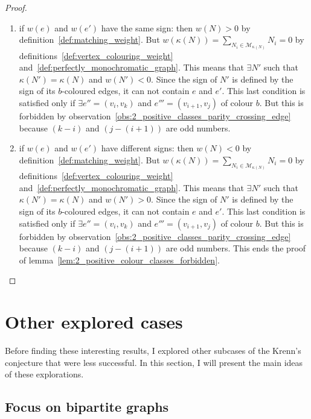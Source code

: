 \begin{proof}
    \begin{enumerate}
        \item if $w(e)$ and $w(e')$ have the same sign: then $w(N) > 0$ by definition~\ref{def:matching_weight}.    %
        But $w(\kappa(N)) = \sum\limits_{N_i \in \mathcal{M}_{\kappa(N)}} N_i = 0$ by definitions~\ref{def:vertex_colouring_weight} and~\ref{def:perfectly_monochromatic_graph}.
        This means that $\exists N'$ such that $\kappa(N') = \kappa(N)$ and $w(N') < 0$.
        Since the sign of $N'$ is defined by the sign of its $b$-coloured edges, it can not contain $e$ and $e'$.
        This last condition is satisfied only if $\exists e'' = (v_i, v_k)$ and $e''' = (v_{i+1}, v_j)$ of colour $b$.
        But this is forbidden by observation~\ref{obs:2_positive_classes_parity_crossing_edge} because $(k - i)$ and $\left(j - (i + 1)\right)$ are odd numbers.

        \item if $w(e)$ and $w(e')$ have different signs: then $w(N) < 0$ by definition~\ref{def:matching_weight}.
        But $w(\kappa(N)) = \sum\limits_{N_i \in \mathcal{M}_{\kappa(N)}} N_i = 0$ by definitions~\ref{def:vertex_colouring_weight} and~\ref{def:perfectly_monochromatic_graph}.
        This means that $\exists N'$ such that $\kappa(N') = \kappa(N)$ and $w(N') > 0$.
        Since the sign of $N'$ is defined by the sign of its $b$-coloured edges, it can not contain $e$ and $e'$.
        This last condition is satisfied only if $\exists e'' = (v_i, v_k)$ and $e''' = (v_{i+1}, v_j)$ of colour $b$.
        But this is forbidden by observation~\ref{obs:2_positive_classes_parity_crossing_edge} because $(k - i)$ and $\left(j - (i + 1)\right)$ are odd numbers.
        This ends the proof of lemma~\ref{lem:2_positive_colour_classes_forbidden}.
    \end{enumerate}
\end{proof}


\section{Other explored cases}
\label{sec:other-explored-cases}

Before finding these interesting results, I explored other subcases of the Krenn's conjecture that were less successful.
In this section, I will present the main ideas of these explorations.

\subsection{Focus on bipartite graphs}
\label{subsec:focus-on-bipartite-graphs}

